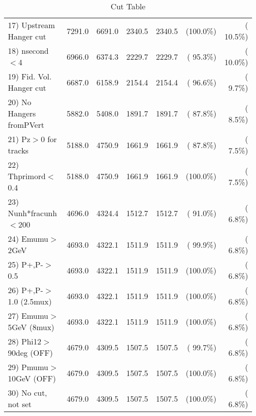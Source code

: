 \begin{table}[h!]
\begin{tabular}{||l||r|r|r|r|r|r||}
 17) Upstream Hanger cut  &       7291.0 &       6691.0 &       2340.5 &       2340.5 & (100.0\%) & ( 10.5\%) \\
 18) nsecond$<$4          &       6966.0 &       6374.3 &       2229.7 &       2229.7 & ( 95.3\%) & ( 10.0\%) \\
 19) Fid. Vol. Hanger cut &       6687.0 &       6158.9 &       2154.4 &       2154.4 & ( 96.6\%) & (  9.7\%) \\
 20) No Hangers fromPVert &       5882.0 &       5408.0 &       1891.7 &       1891.7 & ( 87.8\%) & (  8.5\%) \\
 21) Pz$>$0 for tracks    &       5188.0 &       4750.9 &       1661.9 &       1661.9 & ( 87.8\%) & (  7.5\%) \\
 22) Thprimord$<$0.4      &       5188.0 &       4750.9 &       1661.9 &       1661.9 & (100.0\%) & (  7.5\%) \\
 23) Nunh*fracunh$<$200   &       4696.0 &       4324.4 &       1512.7 &       1512.7 & ( 91.0\%) & (  6.8\%) \\
 24) Emumu$>$2GeV         &       4693.0 &       4322.1 &       1511.9 &       1511.9 & ( 99.9\%) & (  6.8\%) \\
 25) P+,P-$>$0.5          &       4693.0 &       4322.1 &       1511.9 &       1511.9 & (100.0\%) & (  6.8\%) \\
 26) P+,P-$>$1.0 (2.5mux) &       4693.0 &       4322.1 &       1511.9 &       1511.9 & (100.0\%) & (  6.8\%) \\
 27) Emumu$>$5GeV  (8mux) &       4693.0 &       4322.1 &       1511.9 &       1511.9 & (100.0\%) & (  6.8\%) \\
 28) Phi12$>$90deg  (OFF) &       4679.0 &       4309.5 &       1507.5 &       1507.5 & ( 99.7\%) & (  6.8\%) \\
 29) Pmumu$>$10GeV  (OFF) &       4679.0 &       4309.5 &       1507.5 &       1507.5 & (100.0\%) & (  6.8\%) \\
 30) No cut, not set      &       4679.0 &       4309.5 &       1507.5 &       1507.5 & (100.0\%) & (  6.8\%) \\
 \hline
 \hline
 \end{tabular}
 \caption{Cut Table           }
 \label{tab-cutcohjpsi-mumu_ccdis}
 \end{table}
